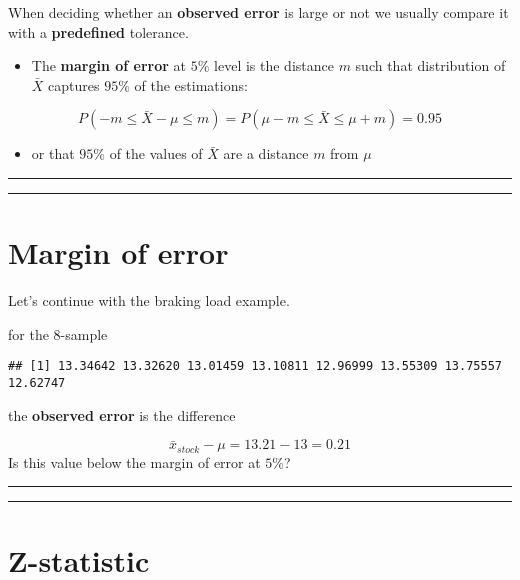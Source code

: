 \documentclass[
]{book}
\providecommand{\tightlist}{%
  \setlength{\itemsep}{0pt}\setlength{\parskip}{0pt}}
\begin{document}
When deciding whether an \textbf{observed error} is large or not we usually compare it with a \textbf{predefined} tolerance.

\begin{itemize}
\tightlist
\item
  The \textbf{margin of error} at \(5\%\) level is the distance \(m\) such that distribution of \(\bar{X}\) captures \(95\%\) of the estimations:
\end{itemize}

\[P(-m \leq \bar{X}-\mu \leq m)=P(\mu-m \leq \bar{X} \leq\mu + m)=0.95\]

\begin{itemize}
\tightlist
\item
  or that \(95\%\) of the values of \(\bar{X}\) are a distance \(m\) from \(\mu\)
\end{itemize}

\begin{center}\rule{0.5\linewidth}{0.5pt}\end{center}

\begin{center}\rule{0.5\linewidth}{0.5pt}\end{center}

\hypertarget{margin-of-error-1}{%
\section{Margin of error}\label{margin-of-error-1}}

Let's continue with the braking load example.

for the \(8\)-sample

\begin{verbatim}
## [1] 13.34642 13.32620 13.01459 13.10811 12.96999 13.55309 13.75557 12.62747
\end{verbatim}

the \textbf{observed error} is the difference

\[\bar{x}_{stock}-\mu=13.21-13=0.21\]
Is this value below the margin of error at \(5\%\)?

\begin{center}\rule{0.5\linewidth}{0.5pt}\end{center}

\begin{center}\rule{0.5\linewidth}{0.5pt}\end{center}

\hypertarget{z-statistic}{%
\section{Z-statistic}\label{z-statistic}}
\end{document}
